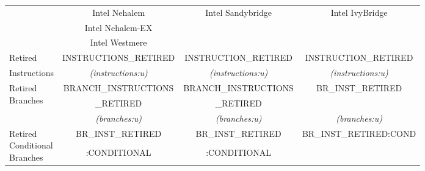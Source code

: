 \begin{tabular}{|l||c|c|c|}

\hline
    & 
Intel Nehalem				&
\multirow{3}{*}{Intel Sandybridge}	&
\multirow{3}{*}{Intel IvyBridge} 	\\

                 & 
Intel Nehalem-EX & 
                 & 
                 \\

                 & 
Intel Westmere   & 
                 & 
                 \\




\hline
\hline


Retired                   &
INSTRUCTIONS\_RETIRED     & %
INSTRUCTION\_RETIRED      & %
INSTRUCTION\_RETIRED      \\ %


Instructions                &
{\em (instructions:u)}      & %
{\em (instructions:u)}      & %
{\em (instructions:u)}      \\ %



\hline
\multirow{3}{*}{\parbox{0.5in}{Retired \\
Branches}}                &
BRANCH\_INSTRUCTIONS      		& %
BRANCH\_INSTRUCTIONS			& %
\multirow{2}{*}{BR\_INST\_RETIRED}	\\ %

		&
\_RETIRED	& %
\_RETIRED       & %
		\\ %


                           &
{\em (branches:u)}         & %
{\em (branches:u)}         & %
{\em (branches:u)}         \\ %



\hline
\multirow{3}{*}{\parbox{0.5in}{Retired \\
Conditional \\
Branches}}                &
BR\_INST\_RETIRED         & %
BR\_INST\_RETIRED         & %
\multirow{2}{*}{BR\_INST\_RETIRED:COND}    \\ %

                  &
:CONDITIONAL      & %
:CONDITIONAL      & %
                  \\ %


\end{tabular}
